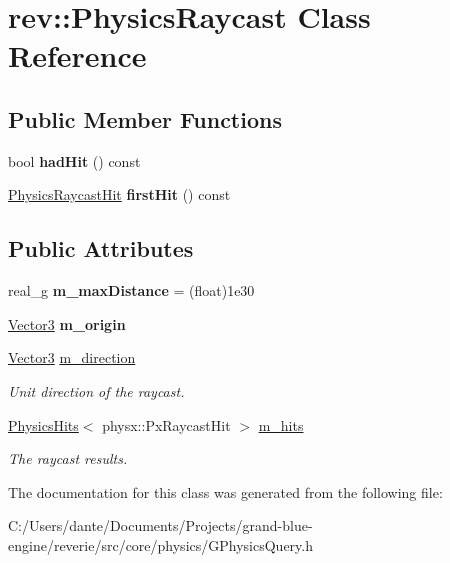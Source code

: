\hypertarget{classrev_1_1_physics_raycast}{}\section{rev\+::Physics\+Raycast Class Reference}
\label{classrev_1_1_physics_raycast}
\subsection*{Public Member Functions}
\begin{DoxyCompactItemize}
\item 
\mbox{\label{classrev_1_1_physics_raycast_af9ced1019f07e16b4a8d34b269cbf2b0}} 
bool {\bfseries had\+Hit} () const
\item 
\mbox{\label{classrev_1_1_physics_raycast_a2901226c81a9925ec387c63230756c52}} 
\mbox{\hyperlink{classrev_1_1_physics_hit}{Physics\+Raycast\+Hit}} {\bfseries first\+Hit} () const
\end{DoxyCompactItemize}
\subsection*{Public Attributes}
\begin{DoxyCompactItemize}
\item 
\mbox{\label{classrev_1_1_physics_raycast_a3f6462ee8b1539cba90c3cb12b362a07}} 
real\+\_\+g {\bfseries m\+\_\+max\+Distance} = (float)1e30
\item 
\mbox{\label{classrev_1_1_physics_raycast_aad421813a348eaca4bade0c0060145dc}} 
\mbox{\hyperlink{classrev_1_1_vector}{Vector3}} {\bfseries m\+\_\+origin}
\item 
\mbox{\label{classrev_1_1_physics_raycast_a026e373419e024e8bacf90354ced358b}} 
\mbox{\hyperlink{classrev_1_1_vector}{Vector3}} \mbox{\hyperlink{classrev_1_1_physics_raycast_a026e373419e024e8bacf90354ced358b}{m\+\_\+direction}}
\begin{DoxyCompactList}\small\item\em Unit direction of the raycast. \end{DoxyCompactList}\item 
\mbox{\label{classrev_1_1_physics_raycast_a6401527ef8b4f73d67227b477983380d}} 
\mbox{\hyperlink{classrev_1_1_physics_hits}{Physics\+Hits}}$<$ physx\+::\+Px\+Raycast\+Hit $>$ \mbox{\hyperlink{classrev_1_1_physics_raycast_a6401527ef8b4f73d67227b477983380d}{m\+\_\+hits}}
\begin{DoxyCompactList}\small\item\em The raycast results. \end{DoxyCompactList}\end{DoxyCompactItemize}


The documentation for this class was generated from the following file\+:\begin{DoxyCompactItemize}
\item 
C\+:/\+Users/dante/\+Documents/\+Projects/grand-\/blue-\/engine/reverie/src/core/physics/G\+Physics\+Query.\+h\end{DoxyCompactItemize}
